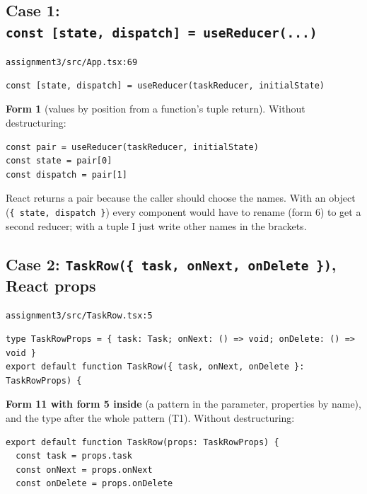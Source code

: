 \documentclass[
  10pt,
]{article}
\begin{document}
\hypertarget{case-1-const-state-dispatch--usereducer}{%
\subsection{\texorpdfstring{Case 1:
\texttt{const\ {[}state,\ dispatch{]\allowbreak{}}\ =\ useReducer(.\allowbreak{}.\allowbreak{}.\allowbreak{})}}{Case 1: }}\label{case-1-const-state-dispatch--usereducer}}

\texttt{assignment3/\allowbreak{}src/\allowbreak{}App.\allowbreak{}tsx:69}

\begin{verbatim}
const [state, dispatch] = useReducer(taskReducer, initialState)
\end{verbatim}

\textbf{Form 1} (values by position from a function's tuple return).
Without destructuring:

\begin{verbatim}
const pair = useReducer(taskReducer, initialState)
const state = pair[0]
const dispatch = pair[1]
\end{verbatim}

React returns a pair because the caller should choose the names. With an
object (\texttt{\{\ state,\ dispatch\ \}}) every component would have to
rename (form 6) to get a second reducer; with a tuple I just write other
names in the brackets.

\hypertarget{case-2-taskrow-task-onnext-ondelete--react-props}{%
\subsection{\texorpdfstring{Case 2:
\texttt{TaskRow(\{\ task,\ onNext,\ onDelete\ \})}, React
props}{Case 2: , React props}}\label{case-2-taskrow-task-onnext-ondelete--react-props}}

\texttt{assignment3/\allowbreak{}src/\allowbreak{}TaskRow.\allowbreak{}tsx:5}

\begin{verbatim}
type TaskRowProps = { task: Task; onNext: () => void; onDelete: () => void }
export default function TaskRow({ task, onNext, onDelete }: TaskRowProps) {
\end{verbatim}

\textbf{Form 11 with form 5 inside} (a pattern in the parameter,
properties by name), and the type after the whole pattern (T1). Without
destructuring:

\begin{verbatim}
export default function TaskRow(props: TaskRowProps) {
  const task = props.task
  const onNext = props.onNext
  const onDelete = props.onDelete
\end{verbatim}
\end{document}
